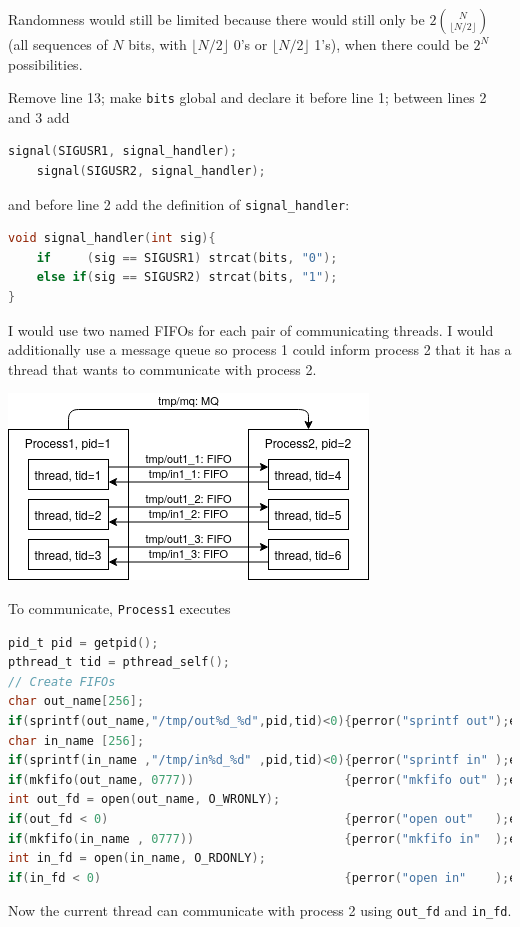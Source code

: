 \documentclass{sope}
\begin{document}
{Randomness would still be limited because there would still only be $2\binom{N}{\lfloor N/2 \rfloor}$ (all sequences of $N$ bits, with $\lfloor N/2 \rfloor$ 0's or $\lfloor N/2 \rfloor$ 1's), when there could be $2^N$ possibilities.

Remove line 13; make \texttt{bits} global and declare it before line 1; between lines 2 and 3 add
\begin{lstlisting}[language=C]
    signal(SIGUSR1, signal_handler);
    signal(SIGUSR2, signal_handler);
\end{lstlisting}
and before line 2 add the definition of \texttt{signal\_handler}:
\begin{lstlisting}[language=C]
void signal_handler(int sig){
    if     (sig == SIGUSR1) strcat(bits, "0");
    else if(sig == SIGUSR2) strcat(bits, "1");
}
\end{lstlisting}

I would use two named FIFOs for each pair of communicating threads. I would additionally use a message queue so process 1 could inform process 2 that it has a thread that wants to communicate with process 2.
\begin{center}
    \includegraphics[scale=0.5]{2017N_07_a}
\end{center}

To communicate, \texttt{Process1} executes
\begin{lstlisting}[language=C,basicstyle=\ttfamily\small]
pid_t pid = getpid();
pthread_t tid = pthread_self();
// Create FIFOs
char out_name[256];
if(sprintf(out_name,"/tmp/out%d_%d",pid,tid)<0){perror("sprintf out");exit(1);}
char in_name [256];
if(sprintf(in_name ,"/tmp/in%d_%d" ,pid,tid)<0){perror("sprintf in" );exit(1);}
if(mkfifo(out_name, 0777))                     {perror("mkfifo out" );exit(1);}
int out_fd = open(out_name, O_WRONLY);
if(out_fd < 0)                                 {perror("open out"   );exit(1);}
if(mkfifo(in_name , 0777))                     {perror("mkfifo in"  );exit(1);}
int in_fd = open(in_name, O_RDONLY);
if(in_fd < 0)                                  {perror("open in"    );exit(1);}
\end{lstlisting}
Now the current thread can communicate with process 2 using \texttt{out\_fd} and \texttt{in\_fd}.

}
\end{document}
